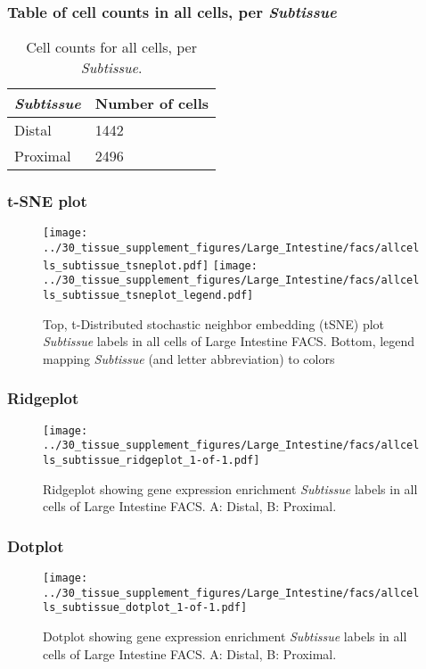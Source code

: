 \subsubsection{Table of cell counts in all cells, per \emph{Subtissue}}\begin{table}[h]
\centering
\label{my-label}
\begin{tabular}{@{}ll@{}}
\toprule

\emph{Subtissue}& Number of cells \\ \midrule
Distal & 1442 \\

Proximal & 2496 \\
\bottomrule
\end{tabular}
\caption{Cell counts for all cells, per \emph{Subtissue}.}
\end{table}

\clearpage
\subsubsection{t-SNE plot}
\begin{figure}[h]
\centering
\texttt{[image: ../30\_tissue\_supplement\_figures/Large\_Intestine/facs/allcells\_subtissue\_tsneplot.pdf]}
\texttt{[image: ../30\_tissue\_supplement\_figures/Large\_Intestine/facs/allcells\_subtissue\_tsneplot\_legend.pdf]}
\caption{Top, t-Distributed stochastic neighbor embedding (tSNE) plot  \emph{Subtissue} labels in all cells of Large Intestine FACS. Bottom, legend mapping \emph{Subtissue} (and letter abbreviation) to colors}
\end{figure}


\clearpage

\subsubsection{Ridgeplot}
\begin{figure}[h]
\centering
\texttt{[image: ../30\_tissue\_supplement\_figures/Large\_Intestine/facs/allcells\_subtissue\_ridgeplot\_1-of-1.pdf]}

\caption{ Ridgeplot  showing gene expression enrichment \emph{Subtissue} labels in all cells of Large Intestine FACS. A: Distal, B: Proximal.}
\end{figure}


\clearpage

\subsubsection{Dotplot}
\begin{figure}[h]
\centering
\texttt{[image: ../30\_tissue\_supplement\_figures/Large\_Intestine/facs/allcells\_subtissue\_dotplot\_1-of-1.pdf]}

\caption{ Dotplot  showing gene expression enrichment \emph{Subtissue} labels in all cells of Large Intestine FACS. A: Distal, B: Proximal.}
\end{figure}

